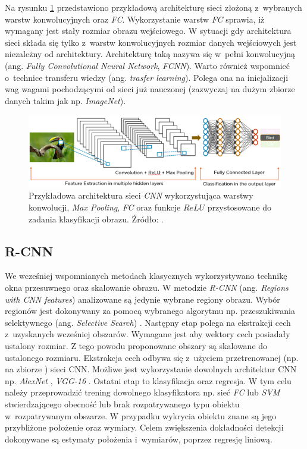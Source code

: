Na rysunku \ref{fig:example_layers} przedstawiono przykładową architekturę sieci złożoną z~wybranych warstw konwolucyjnych oraz \emph{FC}. 
Wykorzystanie warstw \emph{FC} sprawia, iż wymagany jest stały rozmiar obrazu wejściowego.
W sytuacji gdy architektura sieci składa się tylko z~warstw konwolucyjnych rozmiar danych wejściowych jest niezależny od architektury. 
Architekturę taką nazywa się w~pełni konwolucyjną (ang. \emph{Fully Convolutional Neural Network}, \emph{FCNN}).
Warto również wspomnieć o~technice transferu wiedzy (ang. \emph{trasfer learning}). 
Polega ona na inicjalizacji wag wagami pochodzącymi od sieci już nauczonej (zazwyczaj na dużym zbiorze danych takim jak np. \emph{ImageNet}).
\begin{figure}
    \centering
    \includegraphics[width=0.9\linewidth]{images/layers_.png}
    \caption{Przykładowa architektura sieci \emph{CNN} wykorzystująca warstwy konwolucji, \emph{Max Pooling}, \emph{FC} oraz funkcje $ReLU$ przystosowane do zadania klasyfikacji obrazu.
    Źródło: \cite{layers_types}.}
    \label{fig:example_layers}
\end{figure}
 

\subsection{R-CNN}

We wcześniej wspomnianych metodach klasycznych wykorzystywano technikę okna przesuwnego oraz skalowanie obrazu. 
W metodzie \emph{R-CNN} (ang. \emph{Regions with CNN features}) \cite{r_cnn} analizowane są jedynie wybrane regiony obrazu. 
Wybór regionów jest dokonywany za pomocą wybranego algorytmu np. przeszukiwania selektywnego (ang. \emph{Selective Search}) \cite{sel_search}.
Następny etap polega na ekstrakcji cech z~uzyskanych wcześniej obszarów.
Wymagane jest aby wektory cech posiadały ustalony rozmiar. 
Z tego powodu proponowane obszary są skalowane do ustalonego rozmiaru.
Ekstrakcja cech odbywa się z~użyciem przetrenowanej (np. na zbiorze \cite{imagenet}) sieci CNN.
Możliwe jest wykorzystanie dowolnych architektur CNN np. \emph{AlexNet} \cite{alexnet}, \emph{VGG-16} \cite{vgg}.
Ostatni etap to klasyfikacja oraz regresja.
W tym celu należy przeprowadzić trening dowolnego klasyfikatora np. sieć \emph{FC} lub \emph{SVM} stwierdzającego obecność lub brak rozpatrywanego typu obiektu w~rozpatrywanym obszarze.
W przypadku wykrycia obiektu znane są jego przybliżone położenie oraz wymiary.
Celem zwiększenia dokładności detekcji dokonywane są estymaty położenia i~wymiarów, poprzez regresję liniową.

